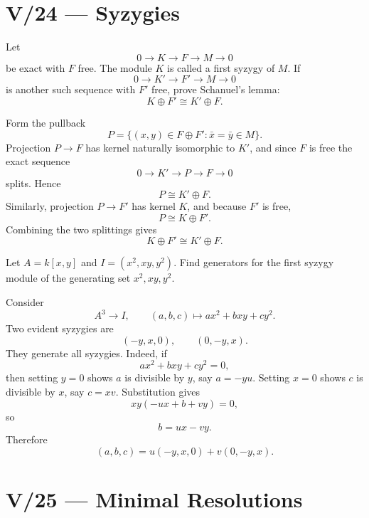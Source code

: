 \section*{V/24 --- Syzygies}

\begin{problem}[CP-V-0111]
\label{prob:cp-v-0111}
Let
\[
0\to K\to F\to M\to0
\]
be exact with \(F\) free. The module \(K\) is called a first syzygy of \(M\). If
\[
0\to K'\to F'\to M\to0
\]
is another such sequence with \(F'\) free, prove Schanuel's lemma:
\[
K\oplus F'\cong K'\oplus F.
\]
\end{problem}

\begin{solution}
Form the pullback
\[
P=\{(x,y)\in F\oplus F':\bar x=\bar y\in M\}.
\]
Projection \(P\to F\) has kernel naturally isomorphic to \(K'\), and since \(F\) is free the exact sequence
\[
0\to K'\to P\to F\to0
\]
splits. Hence
\[
P\cong K'\oplus F.
\]
Similarly, projection \(P\to F'\) has kernel \(K\), and because \(F'\) is free,
\[
P\cong K\oplus F'.
\]
Combining the two splittings gives
\[
K\oplus F'\cong K'\oplus F.
\]
\end{solution}


\begin{problem}[CP-V-0112]
\label{prob:cp-v-0112}
Let \(A=k[x,y]\) and \(I=(x^2,xy,y^2)\). Find generators for the first syzygy module of the generating set \(x^2,xy,y^2\).
\end{problem}

\begin{solution}
Consider
\[
A^3\longrightarrow I,\qquad (a,b,c)\longmapsto ax^2+bxy+cy^2.
\]
Two evident syzygies are
\[
(-y,x,0),\qquad(0,-y,x).
\]
They generate all syzygies. Indeed, if
\[
ax^2+bxy+cy^2=0,
\]
then setting \(y=0\) shows \(a\) is divisible by \(y\), say \(a=-yu\). Setting \(x=0\) shows \(c\) is divisible by \(x\), say \(c=xv\). Substitution gives
\[
xy(-ux+b+vy)=0,
\]
so
\[
b=ux-vy.
\]
Therefore
\[
(a,b,c)=u(-y,x,0)+v(0,-y,x).
\]
\end{solution}



\section*{V/25 --- Minimal Resolutions}

